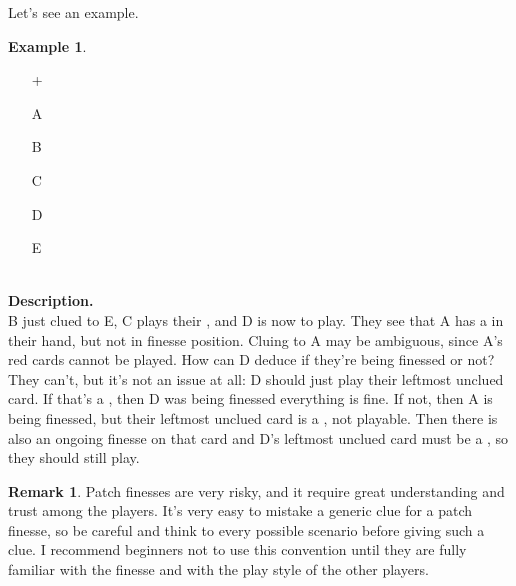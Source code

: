 \documentclass[a4paper]{article}
\theoremstyle{plain}
\theoremstyle{definition}
\newtheorem{remark}[theorem]{Remark}
\newtheorem{example}[theorem]{Example}
\begin{document}
Let's see an example.

\begin{example}	\hfill \\
	\begin{minipage}{0.45\textwidth}
		\begin{itemize}
			\item[\Large +]      
			\item[\Large A]    
			\item[\Large B]    
			\item[\Large C]    
			\item[\Large D]    
			\item[\Large E]    
		\end{itemize}
	\end{minipage}%
	\begin{minipage}{0.55\textwidth}
		\hfill \\
		
		\textbf{Description.} \\
		
		B just clued  to E, C plays their , and D is now to play. They see that A has a  in their hand, but not in finesse position. Cluing  to A may be ambiguous, since A's red cards cannot be played. How can D deduce if they're being finessed or not? They can't, but it's not an issue at all: D should just play their leftmost unclued card. If that's a , then D was being finessed everything is fine. If not, then A is being finessed, but their leftmost unclued card is a , not playable. Then there is also an ongoing finesse on that card and D's leftmost unclued card must be a , so they should still play.	
	\end{minipage}
\end{example} \vspace{0.15 cm}

\begin{remark}
	Patch finesses are very risky, and it require great understanding and trust among the players. It's very easy to mistake a generic clue for a patch finesse, so be careful and think to every possible scenario before giving such a clue. I recommend beginners not to use this convention until they are fully familiar with the finesse and with the play style of the other players.
\end{remark}
\end{document}
